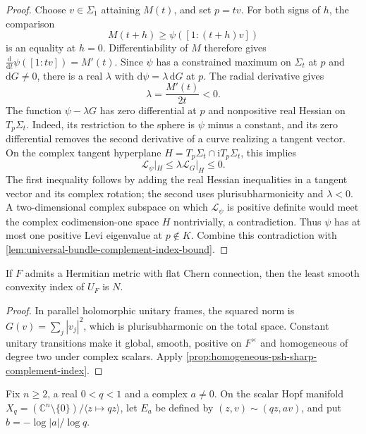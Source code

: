 \begin{proof}
Choose $v\in\Sigma_1$ attaining $M(t)$, and set $p=tv$. For both signs of $h$, the comparison
\[
 M(t+h)\geq\psi([1:(t+h)v])
\]
is an equality at $h=0$. Differentiability of $M$ therefore gives $\frac{\mathrm d}{\mathrm dt}\psi([1:tv])=M'(t)$. Since $\psi$ has a constrained maximum on $\Sigma_t$ at $p$ and $\mathrm dG\ne0$, there is a real $\lambda$ with $\mathrm d\psi=\lambda\,\mathrm dG$ at $p$. The radial derivative gives
\[
 \lambda=\frac{M'(t)}{2t}<0.
\]
The function $\psi-\lambda G$ has zero differential at $p$ and nonpositive real Hessian on $T_p\Sigma_t$. Indeed, its restriction to the sphere is $\psi$ minus a constant, and its zero differential removes the second derivative of a curve realizing a tangent vector. On the complex tangent hyperplane $H=T_p\Sigma_t\cap\mathrm iT_p\Sigma_t$, this implies
\[
 \mathcal L_\psi|_H\leq\lambda\mathcal L_G|_H\leq0.
\]
The first inequality follows by adding the real Hessian inequalities in a tangent vector and its complex rotation; the second uses plurisubharmonicity and $\lambda<0$. A two-dimensional complex subspace on which $\mathcal L_\psi$ is positive definite would meet the complex codimension-one space $H$ nontrivially, a contradiction. Thus $\psi$ has at most one positive Levi eigenvalue at $p\notin K$. Combine this contradiction with \cref{lem:universal-bundle-complement-index-bound}.
\end{proof}

\begin{corollary}\label{cor:unitary-flat-exact-complement-index}
If $F$ admits a Hermitian metric with flat Chern connection, then the least smooth convexity index of $U_F$ is $N$.
\end{corollary}
\begin{proof}
In parallel holomorphic unitary frames, the squared norm is $G(v)=\sum_j|v_j|^2$, which is plurisubharmonic on the total space. Constant unitary transitions make it global, smooth, positive on $F^\times$ and homogeneous of degree two under complex scalars. Apply \cref{prop:homogeneous-psh-sharp-complement-index}.
\end{proof}

Fix $n\geq2$, a real $0<q<1$ and a complex $a\ne0$. On the scalar Hopf manifold $X_q=(\mathbb C^n\setminus\{0\})/\langle z\mapsto qz\rangle$, let $E_a$ be defined by $(z,v)\sim(qz,av)$, and put $b=-\log|a|/\log q$.

